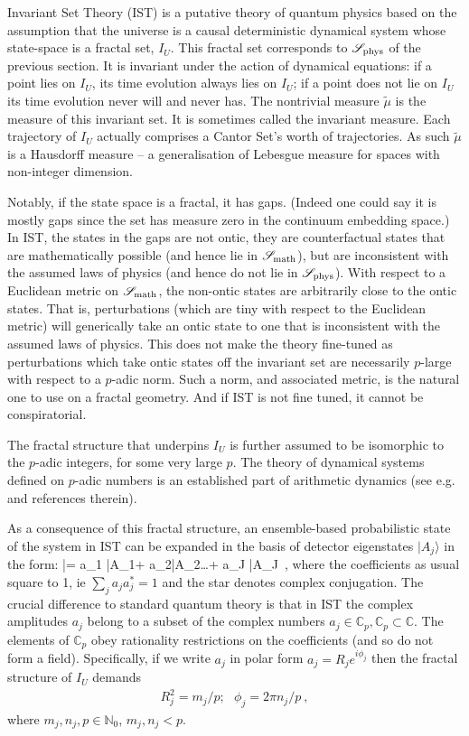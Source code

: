 \documentclass[12pt,superscriptaddress]{revtex4-2}
\makeatletter
\def\beqn{\begin{eqnarray}}
\def\eeqn{\end{eqnarray}}
\newcommand\be{\@ifstar{\[}{\begin{equation}}}
\newcommand\ee{\@ifstar{\]}{\end{equation}}}
\makeatother
\begin{document}
Invariant Set Theory ({\sc IST}) \cite{Palmer2020Discretization,Palmer1995Spin,Palmer2009ISP} is a putative theory of quantum physics based on the assumption that the universe is a causal deterministic dynamical system whose state-space is a fractal set, $I_U$. This fractal set corresponds to ${\mathscr S}_{\rm phys}$ of the previous section. It is invariant under the action of dynamical equations: if a point lies on $I_U$, its time evolution always lies on $I_U$; if a point does not lie on $I_U$ its time evolution never will and never has. The nontrivial measure $\tilde \mu$ is the measure of this invariant set. It is sometimes called the invariant measure. Each trajectory of $I_U$ actually comprises a Cantor Set's worth of trajectories. As such $\tilde \mu$ is a Hausdorff measure \cite{Rogers1998Hausdorff} -- a generalisation of Lebesgue measure for spaces with non-integer dimension. 

Notably, if the state space is a fractal, it has gaps. (Indeed one could say it is mostly gaps since the set has measure zero in the continuum embedding space.) In {\sc IST}, the states in the gaps are not ontic, they are counterfactual states that are mathematically possible (and hence lie in ${\mathscr S}_{\rm math}$), but are inconsistent with the assumed laws of physics (and hence do not lie in ${\mathscr S}_{\rm phys}$). With respect to a Euclidean metric on ${\mathscr S}_{\rm math}$, the non-ontic states are arbitrarily close to the ontic states. That is, perturbations (which are tiny with respect to the Euclidean metric) will generically take an ontic state to one that is inconsistent with the assumed laws of physics. This does not make the theory fine-tuned as perturbations which take ontic states off the invariant set are necessarily $p$-large with respect to a $p$-adic norm. Such a norm, and associated metric, is the natural one to use on a fractal geometry. And if {\rm IST} is not fine tuned, it cannot be conspiratorial. 

The fractal structure that underpins $I_U$ is further assumed to be isomorphic to the $p$-adic integers, for some very large $p$. The theory of dynamical systems defined on $p$-adic numbers is an established part of arithmetic dynamics (see e.g. \cite{Woodcock1998padic} and references therein). 

As a consequence of this fractal structure, an ensemble-based probabilistic state of the system in {\sc IST} can be expanded in the basis of detector eigenstates $|A_j \rangle$ in the form:
\be
|\psi\rangle = a_1 |A_1\rangle + a_2|A_2\rangle \ldots + a_J |A_J\rangle~,
\ee
where the coefficients as usual square to 1, ie $\sum_j a_j a^*_j =1$ and the star denotes complex conjugation.
The crucial difference to standard quantum theory is that in {\sc IST} the complex amplitudes $a_j$ belong to a subset of the complex numbers $a_j \in \mathbb C_p, \mathbb C_p \subset \mathbb C$. The elements of $\mathbb C_p$ obey rationality restrictions on the coefficients (and so do not form a field). Specifically, if we write $a_j$ in polar form $a_j=R_j e^{i \phi_j}$ then the fractal structure of $I_U$ demands
\beqn
\label{finite}
R^2_j=m_j/p; \ \ \ 
\phi_j = 2\pi n_j/p~,
\eeqn
where $m_j,n_j,p \in {\mathbb N}_0$, $m_j,n_j < p$.
\end{document}
